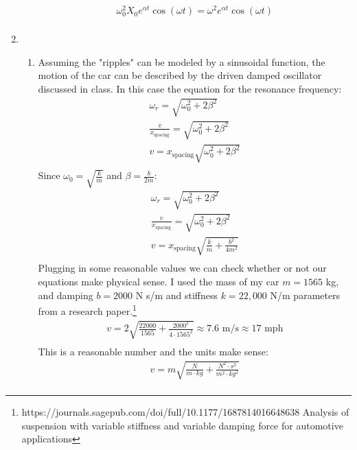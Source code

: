 \documentclass[12pt]{article}
\begin{document}
\begin{enumerate}
\begin{enumerate}
            \begin{gather*}
                \omega_0^2 X_0 e^{\alpha t}\cos(\omega t)=\omega^2 e^{\alpha t}\cos(\omega t)\\
            \end{gather*}
        \end{enumerate}
        \item
        \begin{enumerate}
            \item
            Assuming the "ripples" can be modeled by a sinusoidal function, the motion of the car can be described by the driven damped oscillator discussed in class.
            In this case the equation for the resonance frequency:
            \begin{gather*}
                \omega_r=\sqrt{\omega_0^2+2\beta^2}\\
                \frac{v}{x_\text{spacing}}=\sqrt{\omega_0^2+2\beta^2}\\
                v=x_\text{spacing}\sqrt{\omega_0^2+2\beta^2}\\
            \end{gather*}
            Since $\omega_0=\sqrt{\frac{k}{m}}$ and $\beta=\frac{b}{2m}$:
            \begin{gather*}
                \omega_r=\sqrt{\omega_0^2+2\beta^2}\\
                \frac{v}{x_\text{spacing}}=\sqrt{\omega_0^2+2\beta^2}\\
                v=x_\text{spacing}\sqrt{\frac{k}{m}+\frac{b^2}{4m^2}}\\
            \end{gather*}
            Plugging in some reasonable values we can check whether or not our equations make physical sense.
            I used the mass of my car $m=1565$ kg, and damping $b=2000$ N s/m and stiffness $k=22,000$ N/m parameters from a research paper.\footnote{https://journals.sagepub.com/doi/full/10.1177/1687814016648638 Analysis of suspension with variable stiffness and variable damping force for automotive applications}
            \begin{gather*}
                v=2\sqrt{\frac{22000}{1565}+\frac{2000^2}{4\cdot1565^2}}\approx7.6\text{ m/s}\approx17\text{ mph}\\
            \end{gather*}
            This is a reasonable number and the units make sense:
            \begin{gather*}
                v=m\sqrt{\frac{N}{m\cdot kg}+\frac{N^2\cdot s^2}{m^2\cdot kg^2}}\\

\end{gather*}
\end{enumerate}
\end{enumerate}
\end{document}
